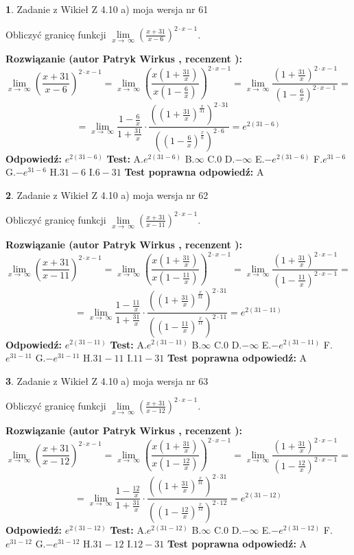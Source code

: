\documentclass[12pt, a4paper]{article}
\theoremstyle{definition} %
\newtheorem{zad}{}
\newcommand{\zadStart}[1]{\begin{zad}#1\newline}
\newcommand{\zadStop}{\end{zad}}
\newcommand{\rozwStart}[2]{\noindent \textbf{Rozwiązanie (autor #1 , recenzent #2): }\newline}
\newcommand{\rozwStop}{\newline}
\newcommand{\odpStart}{\noindent \textbf{Odpowiedź:}\newline}
\newcommand{\odpStop}{\newline}
\newcommand{\testStart}{\noindent \textbf{Test:}\newline}
\newcommand{\testStop}{\newline}
\newcommand{\kluczStart}{\noindent \textbf{Test poprawna odpowiedź:}\newline}
\newcommand{\kluczStop}{\newline}
\begin{document}
\zadStart{Zadanie z Wikieł Z 4.10 a) moja wersja nr 61}


Obliczyć granicę funkcji  $\lim\limits_{x\to\ \infty}(\frac{x+31}{x-6})^{2\cdot x-1}$.
\zadStop
\rozwStart{Patryk Wirkus}{}
$$\lim\limits_{x\to\ \infty}(\frac{x+31}{x-6})^{2\cdot x-1} = \lim\limits_{x\to\ \infty}(\frac{x(1+\frac{31}{x})}{x(1-\frac{6}{x})})^{2\cdot x-1}=\lim\limits_{x\to\ \infty}\frac{(1+\frac{31}{x})^{2\cdot x-1}}{(1-\frac{6}{x})^{2\cdot x-1}}=$$
$$=\lim\limits_{x\to\ \infty}\frac{1-\frac{6}{x}}{1+\frac{31}{x}}\cdot\frac{((1+\frac{31}{x})^{\frac{x}{31}})^{2\cdot31}}{((1-\frac{6}{x})^{\frac{x}{6}})^{2\cdot6}}=e^{2(31-6)}$$
\rozwStop
\odpStart
$e^{2(31-6)}$
\odpStop
\testStart
A.$e^{2(31-6)}$ B.$\infty$ C.$0$ D.$-\infty$ E.$-e^{2(31-6)}$
F.$e^{31-6}$ G.$-e^{31-6}$
H.$31-6$
I.$6-31$
\testStop
\kluczStart
A
\kluczStop



\zadStart{Zadanie z Wikieł Z 4.10 a) moja wersja nr 62}


Obliczyć granicę funkcji  $\lim\limits_{x\to\ \infty}(\frac{x+31}{x-11})^{2\cdot x-1}$.
\zadStop
\rozwStart{Patryk Wirkus}{}
$$\lim\limits_{x\to\ \infty}(\frac{x+31}{x-11})^{2\cdot x-1} = \lim\limits_{x\to\ \infty}(\frac{x(1+\frac{31}{x})}{x(1-\frac{11}{x})})^{2\cdot x-1}=\lim\limits_{x\to\ \infty}\frac{(1+\frac{31}{x})^{2\cdot x-1}}{(1-\frac{11}{x})^{2\cdot x-1}}=$$
$$=\lim\limits_{x\to\ \infty}\frac{1-\frac{11}{x}}{1+\frac{31}{x}}\cdot\frac{((1+\frac{31}{x})^{\frac{x}{31}})^{2\cdot31}}{((1-\frac{11}{x})^{\frac{x}{11}})^{2\cdot11}}=e^{2(31-11)}$$
\rozwStop
\odpStart
$e^{2(31-11)}$
\odpStop
\testStart
A.$e^{2(31-11)}$ B.$\infty$ C.$0$ D.$-\infty$ E.$-e^{2(31-11)}$
F.$e^{31-11}$ G.$-e^{31-11}$
H.$31-11$
I.$11-31$
\testStop
\kluczStart
A
\kluczStop



\zadStart{Zadanie z Wikieł Z 4.10 a) moja wersja nr 63}


Obliczyć granicę funkcji  $\lim\limits_{x\to\ \infty}(\frac{x+31}{x-12})^{2\cdot x-1}$.
\zadStop
\rozwStart{Patryk Wirkus}{}
$$\lim\limits_{x\to\ \infty}(\frac{x+31}{x-12})^{2\cdot x-1} = \lim\limits_{x\to\ \infty}(\frac{x(1+\frac{31}{x})}{x(1-\frac{12}{x})})^{2\cdot x-1}=\lim\limits_{x\to\ \infty}\frac{(1+\frac{31}{x})^{2\cdot x-1}}{(1-\frac{12}{x})^{2\cdot x-1}}=$$
$$=\lim\limits_{x\to\ \infty}\frac{1-\frac{12}{x}}{1+\frac{31}{x}}\cdot\frac{((1+\frac{31}{x})^{\frac{x}{31}})^{2\cdot31}}{((1-\frac{12}{x})^{\frac{x}{12}})^{2\cdot12}}=e^{2(31-12)}$$
\rozwStop
\odpStart
$e^{2(31-12)}$
\odpStop
\testStart
A.$e^{2(31-12)}$ B.$\infty$ C.$0$ D.$-\infty$ E.$-e^{2(31-12)}$
F.$e^{31-12}$ G.$-e^{31-12}$
H.$31-12$
I.$12-31$
\testStop
\kluczStart
A
\kluczStop
\end{document}
